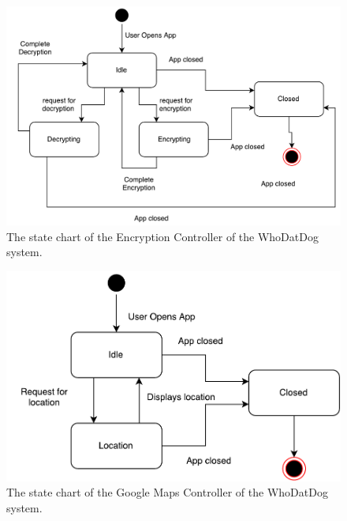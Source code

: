 \documentclass[]{article}
\begin{document}
\begin{figure}[H]
	\centering
	\includegraphics[width=\textwidth]{EncryptionController.pdf}
	\caption{\label{fig:analysisclassdiagram}The state chart of the Encryption Controller of the WhoDatDog system.}
\end{figure}


\begin{figure}[H]
	\centering
	\includegraphics[width=\textwidth]{GoogleMapsController.pdf}
	\caption{\label{fig:analysisclassdiagram}The state chart of the Google Maps Controller of the WhoDatDog system.}
\end{figure}
\end{document}
